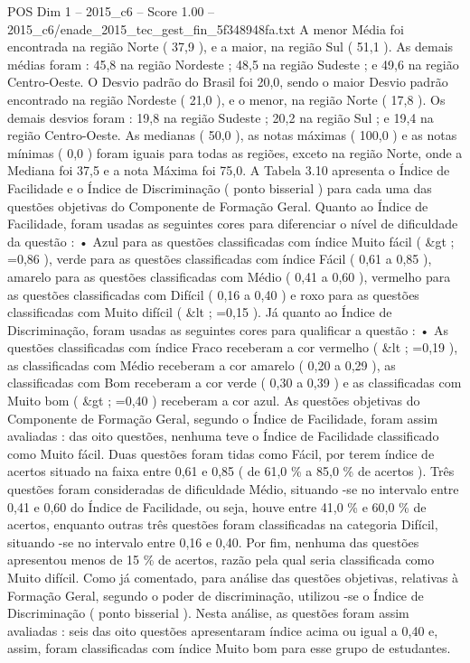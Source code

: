 \begin{textsample}{POS Dim 1 – 2015\_c6 – Score 1.00 – 2015\_c6/enade\_2015\_tec\_gest\_fin\_5f348948fa.txt}
A menor Média foi encontrada na região Norte ( 37,9 ), e a maior, na região Sul ( 51,1 ).
As demais médias foram : 45,8 na região Nordeste ; 48,5 na região Sudeste ; e 49,6 na região Centro-Oeste.
O Desvio padrão do Brasil foi 20,0, sendo o maior Desvio padrão encontrado na região Nordeste ( 21,0 ), e o menor, na região Norte ( 17,8 ).
Os demais desvios foram : 19,8 na região Sudeste ; 20,2 na região Sul ; e 19,4 na região Centro-Oeste.
As medianas ( 50,0 ), as notas máximas ( 100,0 ) e as notas mínimas ( 0,0 ) foram iguais para todas as regiões, exceto na região Norte, onde a Mediana foi 37,5 e a nota Máxima foi 75,0.
A Tabela 3.10 apresenta o Índice de Facilidade e o Índice de Discriminação ( ponto bisserial ) para cada uma das questões objetivas do Componente de Formação Geral.
Quanto ao Índice de Facilidade, foram usadas as seguintes cores para diferenciar o nível de dificuldade da questão : • Azul para as questões classificadas com índice Muito fácil ( \&gt ; =0,86 ), verde para as questões classificadas com índice Fácil ( 0,61 a 0,85 ), amarelo para as questões classificadas com Médio ( 0,41 a 0,60 ), vermelho para as questões classificadas com Difícil ( 0,16 a 0,40 ) e roxo para as questões classificadas com Muito difícil ( \&lt ; =0,15 ).
Já quanto ao Índice de Discriminação, foram usadas as seguintes cores para qualificar a questão : • As questões classificadas com índice Fraco receberam a cor vermelho ( \&lt ; =0,19 ), as classificadas com Médio receberam a cor amarelo ( 0,20 a 0,29 ), as classificadas com Bom receberam a cor verde ( 0,30 a 0,39 ) e as classificadas com Muito bom ( \&gt ; =0,40 ) receberam a cor azul.
As questões objetivas do Componente de Formação Geral, segundo o Índice de Facilidade, foram assim avaliadas : das oito questões, nenhuma teve o Índice de Facilidade classificado como Muito fácil.
Duas questões foram tidas como Fácil, por terem índice de acertos situado na faixa entre 0,61 e 0,85 ( de 61,0 \% a 85,0 \% de acertos ).
Três questões foram consideradas de dificuldade Médio, situando -se no intervalo entre 0,41 e 0,60 do Índice de Facilidade, ou seja, houve entre 41,0 \% e 60,0 \% de acertos, enquanto outras três questões foram classificadas na categoria Difícil, situando -se no intervalo entre 0,16 e 0,40.
Por fim, nenhuma das questões apresentou menos de 15 \% de acertos, razão pela qual seria classificada como Muito difícil.
Como já comentado, para análise das questões objetivas, relativas à Formação Geral, segundo o poder de discriminação, utilizou -se o Índice de Discriminação ( ponto bisserial ).
Nesta análise, as questões foram assim avaliadas : seis das oito questões apresentaram índice acima ou igual a 0,40 e, assim, foram classificadas com índice Muito bom para esse grupo de estudantes.

\end{textsample}
